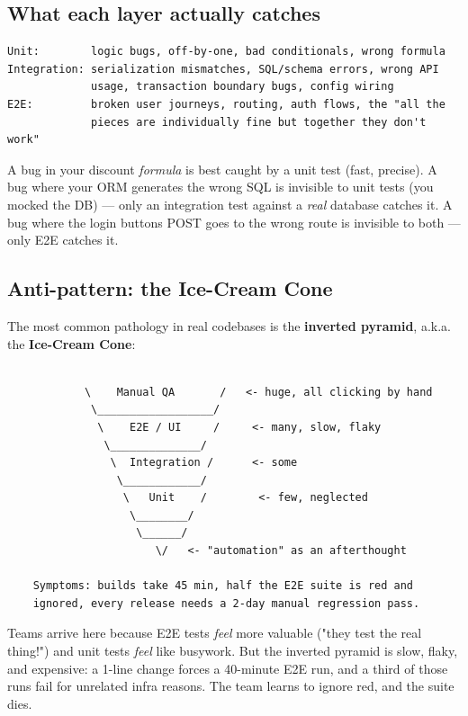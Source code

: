 \documentclass[11pt]{article}
\begin{document}
\subsection{What each layer actually catches}\label{what-each-layer-actually-catches}

\setcodelang{}

\begin{verbatim}
Unit:        logic bugs, off-by-one, bad conditionals, wrong formula
Integration: serialization mismatches, SQL/schema errors, wrong API
             usage, transaction boundary bugs, config wiring
E2E:         broken user journeys, routing, auth flows, the "all the
             pieces are individually fine but together they don't work"
\end{verbatim}

A bug in your discount \emph{formula} is best caught by a unit test (fast, precise). A bug where your ORM generates the wrong SQL is invisible to unit tests (you mocked the DB) --- only an integration test against a \emph{real} database catches it. A bug where the login button\textquotesingle s POST goes to the wrong route is invisible to both --- only E2E catches it.

\subsection{Anti-pattern: the Ice-Cream Cone}\label{anti-pattern-the-ice-cream-cone}

The most common pathology in real codebases is the \textbf{inverted pyramid}, a.k.a. the \textbf{Ice-Cream Cone}:

\setcodelang{}

\begin{verbatim}

            \    Manual QA       /   <- huge, all clicking by hand
             \__________________/
              \    E2E / UI     /     <- many, slow, flaky
               \______________/
                \  Integration /      <- some
                 \____________/
                  \   Unit    /        <- few, neglected
                   \________/
                    \______/
                       \/   <- "automation" as an afterthought

    Symptoms: builds take 45 min, half the E2E suite is red and
    ignored, every release needs a 2-day manual regression pass.
\end{verbatim}

Teams arrive here because E2E tests \emph{feel} more valuable ("they test the real thing!") and unit tests \emph{feel} like busywork. But the inverted pyramid is slow, flaky, and expensive: a 1-line change forces a 40-minute E2E run, and a third of those runs fail for unrelated infra reasons. The team learns to ignore red, and the suite dies.
\end{document}
